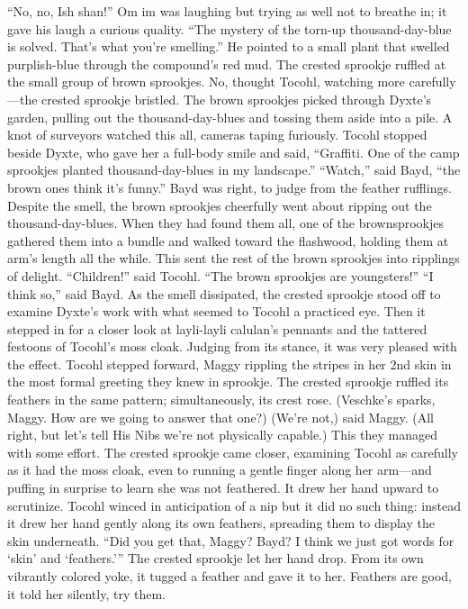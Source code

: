 \documentclass[9pt]{article}
\begin{document}
“No, no, Ish shan!” Om im was laughing but trying as well not to breathe in; it gave his laugh a
curious quality. “The mystery of the torn-up thousand-day-blue is solved. That’s what you’re smelling.”
He pointed to a small plant that swelled purplish-blue through the compound’s red mud.
The crested sprookje ruffled at the small group of brown sprookjes. No, thought Tocohl, watching
more carefully—the crested sprookje bristled. The brown sprookjes picked through Dyxte’s garden,
pulling out the thousand-day-blues and tossing them aside into a pile.
A knot of surveyors watched this all, cameras taping furiously. Tocohl stopped beside Dyxte, who
gave her a full-body smile and said, “Graffiti. One of the camp sprookjes planted thousand-day-blues in
my landscape.”
“Watch,” said Bayd, “the brown ones think it’s funny.”
Bayd was right, to judge from the feather rufflings. Despite the smell, the brown sprookjes cheerfully
went about ripping out the thousand-day-blues. When they had found them all, one of the brownsprookjes gathered them into a bundle and walked toward the flashwood, holding them at arm’s length
all the while.
This sent the rest of the brown sprookjes into ripplings of delight.
“Children!” said Tocohl. “The brown sprookjes are youngsters!”
“I think so,” said Bayd.
As the smell dissipated, the crested sprookje stood off to examine Dyxte’s work with what seemed
to Tocohl a practiced eye. Then it stepped in for a closer look at layli-layli calulan’s pennants and the
tattered festoons of Tocohl’s moss cloak. Judging from its stance, it was very pleased with the effect.
Tocohl stepped forward, Maggy rippling the stripes in her 2nd skin in the most formal greeting they
knew in sprookje. The crested sprookje ruffled its feathers in the same pattern; simultaneously, its crest
rose. (Veschke’s sparks, Maggy. How are we going to answer that one?)
(We’re not,) said Maggy.
(All right, but let’s tell His Nibs we’re not physically capable.)
This they managed with some effort. The crested sprookje came closer, examining Tocohl as
carefully as it had the moss cloak, even to running a gentle finger along her arm—and puffing in surprise
to learn she was not feathered. It drew her hand upward to scrutinize. Tocohl winced in anticipation of a
nip but it did no such thing: instead it drew her hand gently along its own feathers, spreading them to
display the skin underneath.
“Did you get that, Maggy? Bayd? I think we just got words for ‘skin’ and ‘feathers.’”
The crested sprookje let her hand drop. From its own vibrantly colored yoke, it tugged a feather and
gave it to her. Feathers are good, it told her silently, try them.
\end{document}
